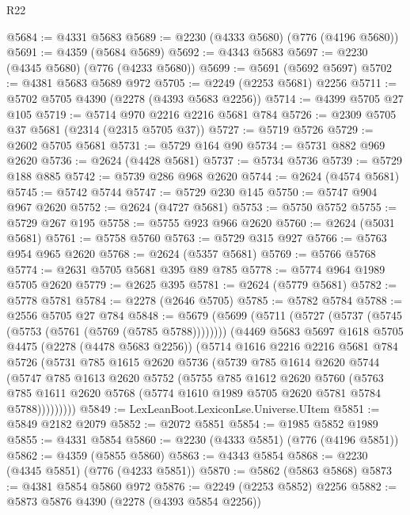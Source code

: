 \begin{lexlean}{R22}
\begin{coremodule}
@5684 := @4331 @5683
@5689 := @2230 (@4333 @5680) (@776 (@4196 @5680))
@5691 := @4359 (@5684 @5689)
@5692 := @4343 @5683
@5697 := @2230 (@4345 @5680) (@776 (@4233 @5680))
@5699 := @5691 (@5692 @5697)
@5702 := @4381 @5683 @5689 @972
@5705 := @2249 (@2253 @5681) @2256
@5711 := @5702 @5705 @4390 (@2278 (@4393 @5683 @2256))
@5714 := @4399 @5705 @27 @105
@5719 := @5714 @970 @2216 @2216 @5681 @784
@5726 := @2309 @5705 @37 @5681 (@2314 (@2315 @5705 @37))
@5727 := @5719 @5726
@5729 := @2602 @5705 @5681
@5731 := @5729 @164 @90
@5734 := @5731 @882 @969 @2620
@5736 := @2624 (@4428 @5681)
@5737 := @5734 @5736
@5739 := @5729 @188 @885
@5742 := @5739 @286 @968 @2620
@5744 := @2624 (@4574 @5681)
@5745 := @5742 @5744
@5747 := @5729 @230 @145
@5750 := @5747 @904 @967 @2620
@5752 := @2624 (@4727 @5681)
@5753 := @5750 @5752
@5755 := @5729 @267 @195
@5758 := @5755 @923 @966 @2620
@5760 := @2624 (@5031 @5681)
@5761 := @5758 @5760
@5763 := @5729 @315 @927
@5766 := @5763 @954 @965 @2620
@5768 := @2624 (@5357 @5681)
@5769 := @5766 @5768
@5774 := @2631 @5705 @5681 @395 @89 @785
@5778 := @5774 @964 @1989 @5705 @2620
@5779 := @2625 @395
@5781 := @2624 (@5779 @5681)
@5782 := @5778 @5781
@5784 := @2278 (@2646 @5705)
@5785 := @5782 @5784
@5788 := @2556 @5705 @27 @784
@5848 := @5679
    (@5699
      (@5711 (@5727 (@5737 (@5745 (@5753 (@5761 (@5769 (@5785 @5788))))))))
      (@4469
        @5683
        @5697
        @1618
        @5705
        @4475
        (@2278 (@4478 @5683 @2256))
        (@5714
          @1616
          @2216
          @2216
          @5681
          @784
          @5726
          (@5731
            @785
            @1615
            @2620
            @5736
            (@5739
              @785
              @1614
              @2620
              @5744
              (@5747
                @785
                @1613
                @2620
                @5752
                (@5755
                  @785
                  @1612
                  @2620
                  @5760
                  (@5763
                    @785
                    @1611
                    @2620
                    @5768
                    (@5774 @1610 @1989 @5705 @2620 @5781 @5784 @5788)))))))))
@5849 := LexLeanBoot.LexiconLse.Universe.UItem
@5851 := @5849 @2182 @2079
@5852 := @2072 @5851
@5854 := @1985 @5852 @1989
@5855 := @4331 @5854
@5860 := @2230 (@4333 @5851) (@776 (@4196 @5851))
@5862 := @4359 (@5855 @5860)
@5863 := @4343 @5854
@5868 := @2230 (@4345 @5851) (@776 (@4233 @5851))
@5870 := @5862 (@5863 @5868)
@5873 := @4381 @5854 @5860 @972
@5876 := @2249 (@2253 @5852) @2256
@5882 := @5873 @5876 @4390 (@2278 (@4393 @5854 @2256))

\end{coremodule}
\end{lexlean}
